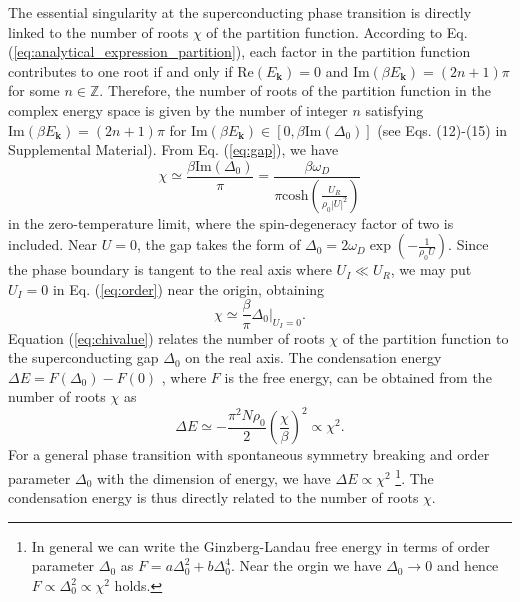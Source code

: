 \documentclass[aps,prl,twocolumn,superscriptaddress]{revtex4-1}
\begin{document}
The essential singularity at the superconducting phase transition is directly linked to the number of roots $\chi$ of the partition function. According to Eq. (\ref{eq:analytical_expression_partition}), each factor in the partition function contributes to one root if and only if $\mathrm{Re}(E_{\bm{k}})=0$ and $\mathrm{Im}(\beta E_{\bm{k}})=(2n+1)\pi$ for some $n\in\mathbb{Z}$. Therefore, the number of roots of the partition function in the complex energy space is given by the number of integer $n$ satisfying $\mathrm{Im}(\beta E_{\bm{k}})=(2n+1)\pi$ for $ \mathrm{Im}(\beta E_{\bm{k}})\in [0, \beta \text{Im}(\Delta_0)]$ (see Eqs. (12)-(15) in Supplemental Material). From Eq. (\ref{eq:gap}), we have
\begin{equation}
\chi\simeq\frac{\beta\text{Im}(\Delta_0)}{\pi}=\frac{\beta\omega_{D}}{\pi\text{cosh}(\frac{U_{R}}{\rho_{0}|U|^{2}})}\label{eq:order}
\end{equation}
in the zero-temperature limit, where the spin-degeneracy factor of two is included. %
Near $U=0$, the gap takes the form of $\Delta_0=2\omega_{D}\exp(-\frac{1}{\rho_{0}U})$.
Since the phase boundary is tangent to the real axis where $U_{I}\ll U_{R}$,
we may put $U_{I}=0$ in Eq. (\ref{eq:order}) near the origin, obtaining%
\begin{equation}
\chi\simeq\frac{\beta}{\pi}\Delta_0|_{U_I=0}.\label{eq:chivalue}
\end{equation}
Equation (\ref{eq:chivalue}) relates the number of roots $\chi$ of
the partition function %
to the superconducting gap $\Delta_0$ on the real axis. The %
condensation energy $\Delta E=F(\Delta_0)-F(0)$ \cite{Coleman:2015vz}, %
where $F$ is the free energy, can be obtained from the number of roots $\chi$ %
as \cite{SupplementaryMaterial}
\begin{equation}
	\Delta E\simeq-\frac{\pi^2N\rho_0}{2}\left(\frac{\chi}{\beta}\right)^2\propto\chi^2.
\end{equation}
For a general phase transition with spontaneous symmetry breaking and order parameter $\Delta_0$ with the dimension of energy, we have $\Delta E\propto\chi^2$ \footnote{In general we can write the Ginzberg-Landau free energy in terms of order parameter $\Delta_0$ as $F=a\Delta_0^2+b\Delta_0^4$. Near the orgin we have $\Delta_0\to0$ and hence $F\propto\Delta_0^2\propto\chi^2$ holds.}. The condensation energy is thus directly related to the number of roots $\chi$. 
\end{document}
